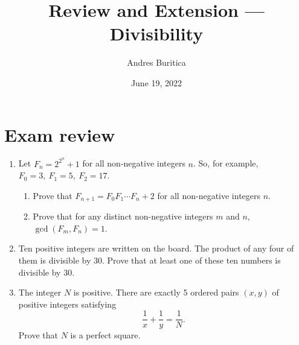 \documentclass{article}
\title{Review and Extension --- Divisibility}
\author{Andres Buritica}
\date{June 19, 2022}
\begin{document}
\maketitle
\section{Exam review}
\begin{enumerate}
  \item Let $F_n=2^{2^n}+1$ for all non-negative integers $n$. So, for example,
    $F_0=3,\ F_1=5,\ F_2=17$.
    \begin{enumerate}
      \item Prove that $F_{n+1}=F_0F_1\cdots F_n+2$ for all non-negative
        integers $n$.
      \item Prove that for any distinct non-negative integers $m$ and $n$,
        $\gcd(F_m,F_n)=1$.
    \end{enumerate}
  \item
    Ten positive integers are written on the board. The product of any four of
    them is divisible by $30$. Prove that at least one of these ten numbers is
    divisible by $30$.
  \item The integer $N$ is positive. There are exactly 5 ordered pairs
    $(x,y)$ of positive integers satisfying \[\frac1x+\frac1y=\frac1N.\]
    Prove that $N$ is a perfect square.
\end{enumerate}
\newpage
\end{document}
